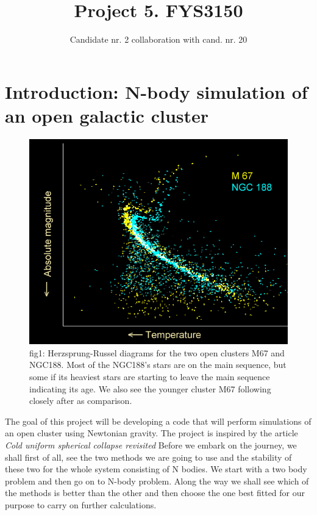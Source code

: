 \documentclass{article}
\begin{document}
\title{Project 5. FYS3150}
\author{Candidate nr. 2 collaboration with cand. nr. 20}
\maketitle
\newpage

\section{Introduction: N-body simulation of an open galactic cluster}
\begin{figure}[h!]
  \centering
  \includegraphics[scale=0.5]{fig.png}
  \caption{fig1: Herzsprung-Russel diagrams for the two open clusters M67 and NGC188. Most of the NGC188's stars are on the main sequence, but some if its heaviest stars are starting to leave the main sequence indicating its age. We also see the younger cluster M67 following closely after as comparison.}
\end{figure}

The goal of this project will be developing a code that will perform simulations of an open cluster using Newtonian gravity. The project is inspired by the article \textit{Cold uniform spherical collapse revisited} \cite{art}
Before we embark on the journey, we shall first of all, see the two methods we are going to use and the stability of these two for the whole system consisting of N bodies. We start with a two body problem and then go on to N-body problem. Along the way we shall see which of the methods is better than the other and then choose the one best fitted for our purpose to carry on further calculations. 
\end{document}
